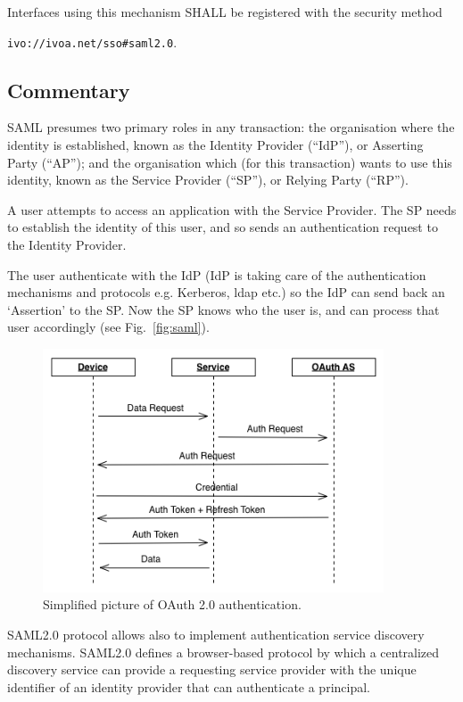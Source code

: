 \documentclass[11pt,a4paper]{ivoa}
\begin{document}
Interfaces using this mechanism SHALL  be registered with the security method 

\texttt{ivo://ivoa.net/sso\#saml2.0}.


\subsection{Commentary}
SAML presumes two primary roles in any transaction: the organisation where the identity is established, 
known as the Identity Provider (``IdP''), or Asserting Party (``AP''); 
and the organisation which (for this transaction) wants to use this identity, known as the Service Provider (``SP''), 
or Relying Party (``RP'').

A user attempts to access an application with the Service Provider. 
The SP needs to establish the identity of this user, and so sends an authentication request to the Identity Provider. 

The user authenticate with the IdP (IdP is taking care of the authentication mechanisms and protocols e.g. Kerberos, ldap etc.) so the IdP can send back an `Assertion' to the SP. 
Now the SP knows who the user is, and can process that user accordingly (see Fig.~\ref{fig:saml}).
\begin{figure}
\centering
\includegraphics[width=0.9\textwidth]{SSO_image003.png}
\caption{Simplified picture of OAuth 2.0 authentication.} 
\label{fig:oauth}
\end{figure}
 
SAML2.0 protocol allows also to implement authentication service discovery mechanisms. SAML2.0  defines a browser-based protocol 
by which a centralized discovery service can provide a requesting service provider with the unique identifier of an 
identity provider that can authenticate a principal.  
\end{document}

